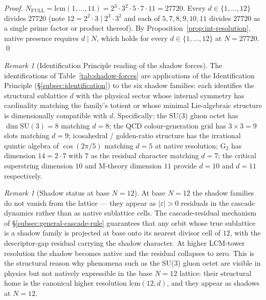 \documentclass[11pt,a4paper]{article}
\theoremstyle{definition}
\theoremstyle{remark}
\newtheorem{remark}[theorem]{Remark}
\begin{document}
\begin{proof}
$N_{\mathrm{FULL}} = \mathrm{lcm}(1,\ldots,11) = 2^{3}\cdot 3^{2}\cdot 5\cdot 7\cdot 11 = 27720$. Every $d\in\{1,\ldots,12\}$ divides $27720$ (note $12 = 2^{2}\cdot 3 \mid 2^{3}\cdot 3^{2}$ and each of $5,7,8,9,10,11$ divides $27720$ as a single prime factor or product thereof). By Proposition~\ref{prop:int-resolution}, native presence requires $d\mid N$, which holds for every $d\in\{1,\ldots,12\}$ at $N=27720$. \qed
\end{proof}

\begin{remark}[Identification Principle reading of the shadow forces]\label{rem:shadow-identification}
The identifications of Table~\ref{tab:shadow-forces} are applications of the Identification Principle (\S\ref{subsec:identification}) to the six shadow families: each identifies the structural sublattice $d$ with the physical sector whose internal symmetry has cardinality matching the family's totient or whose minimal Lie-algebraic structure is dimensionally compatible with $d$. Specifically: the SU(3) gluon octet has $\dim\mathrm{SU}(3)=8$ matching $d=8$; the QCD colour-generation grid has $3\times 3 = 9$ slots matching $d=9$; icosahedral / golden-ratio structure has the irrational quintic algebra of $\cos(2\pi/5)$ matching $d=5$ at native resolution; G$_{2}$ has dimension $14 = 2\cdot 7$ with $7$ as the residual character matching $d=7$; the critical superstring dimension $10$ and M-theory dimension $11$ provide $d=10$ and $d=11$ respectively.
\end{remark}

\begin{remark}[Shadow status at base $N=12$]\label{rem:shadow-base}
At base $N=12$ the shadow families do not vanish from the lattice --- they appear as $|\varepsilon|>0$ residuals in the cascade dynamics rather than as native sublattice cells. The cascade-residual mechanism of \S\ref{subsec:general-cascade-rule} guarantees that any orbit whose true sublattice is a shadow family is projected at base onto its nearest divisor cell of $12$, with the descriptor-gap residual carrying the shadow character. At higher LCM-tower resolution the shadow becomes native and the residual collapses to zero. This is the structural reason why phenomena such as the SU(3) gluon octet are visible in physics but not natively expressible in the base $N=12$ lattice: their structural home is the canonical higher resolution $\mathrm{lcm}(12,d)$, and they appear as shadows at $N=12$.
\end{remark}
\end{document}
